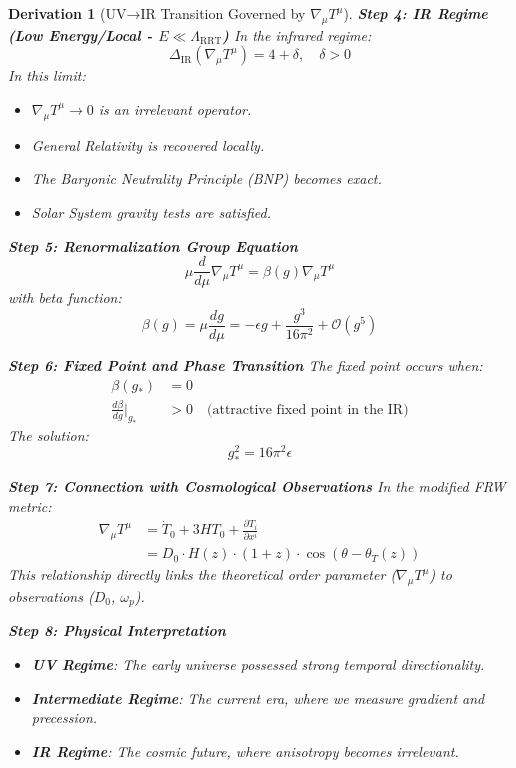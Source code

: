\documentclass[10pt, a4paper]{article}
\newtheorem{derivation}{Derivation}
\begin{document}
\begin{derivation}[UV→IR Transition Governed by $\nabla_\mu T^\mu$]
\textbf{Step 4: IR Regime (Low Energy/Local - $E \ll \Lambda_{\text{RRT}}$)}
In the infrared regime:
\begin{equation}
\Delta_{\text{IR}}(\nabla_\mu T^\mu) = 4 + \delta, \quad \delta > 0
\tag{1.13}
\end{equation}
In this limit:
\begin{itemize}
\item $\nabla_\mu T^\mu \to 0$ is an irrelevant operator.
\item General Relativity is recovered locally.
\item The Baryonic Neutrality Principle (BNP) becomes exact.
\item Solar System gravity tests are satisfied.
\end{itemize}

\textbf{Step 5: Renormalization Group Equation}
\begin{equation}
\mu \frac{d}{d\mu} \nabla_\mu T^\mu = \beta(g) \nabla_\mu T^\mu
\tag{1.14}
\end{equation}
with beta function:
\begin{equation}
\beta(g) = \mu \frac{dg}{d\mu} = - \epsilon g + \frac{g^3}{16\pi^2} + \mathcal{O}(g^5)
\tag{1.15}
\end{equation}

\textbf{Step 6: Fixed Point and Phase Transition}
The fixed point occurs when:
\begin{align}
\beta(g_*) &= 0
\tag{1.16} \\
\frac{d\beta}{dg}\bigg|_{g_*} &> 0 \quad \text{(attractive fixed point in the IR)}
\tag{1.17}
\end{align}
The solution:
\begin{equation}
g_*^2 = 16\pi^2 \epsilon
\tag{1.18}
\end{equation}

\textbf{Step 7: Connection with Cosmological Observations}
In the modified FRW metric:
\begin{align}
\nabla_\mu T^\mu &= \dot{T}_0 + 3H T_0 + \frac{\partial T_i}{\partial x^i}
\tag{1.19} \\
&= D_0 \cdot H(z) \cdot (1+z) \cdot \cos(\theta - \theta_T(z))
\tag{1.20}
\end{align}
This relationship directly links the theoretical order parameter ($\nabla_\mu T^\mu$) to observations ($D_0$, $\omega_p$).

\textbf{Step 8: Physical Interpretation}
\begin{itemize}
\item \textbf{UV Regime}: The early universe possessed strong temporal directionality.
\item \textbf{Intermediate Regime}: The current era, where we measure gradient and precession.
\item \textbf{IR Regime}: The cosmic future, where anisotropy becomes irrelevant.
\end{itemize}


\end{derivation}
\end{document}
